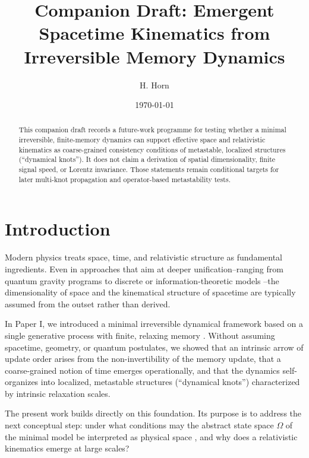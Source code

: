\documentclass[reprint,amsmath,amssymb,aps,prl,nofootinbib,floatfix]{revtex4-2}
\begin{document}
\title{Companion Draft: Emergent Spacetime Kinematics from Irreversible Memory Dynamics}

\author{H. Horn}

\date{\today}

\begin{abstract}
This companion draft records a future-work programme for testing whether a minimal irreversible, finite-memory dynamics can support effective space and relativistic kinematics as coarse-grained consistency conditions of metastable, localized structures (``dynamical knots''). It does not claim a derivation of spatial dimensionality, finite signal speed, or Lorentz invariance. Those statements remain conditional targets for later multi-knot propagation and operator-based metastability tests.
\end{abstract}

\maketitle


\section{Introduction}\label{sec:introduction}

Modern physics treats space, time, and relativistic structure as fundamental ingredients. Even in approaches that aim at deeper unification--ranging from quantum gravity programs \cite{Rovelli2004Quantum} to discrete or information-theoretic models \cite{Bombelli1987Causal,Wen2004Quantum}--the dimensionality of space and the kinematical structure of spacetime are typically assumed from the outset rather than derived.

In Paper I, we introduced a minimal irreversible dynamical framework based on a single generative process with finite, relaxing memory \cite{Mori1965Transport,Zwanzig2001Nonequilibrium,Hanggi1995Colored}. Without assuming spacetime, geometry, or quantum postulates, we showed that an intrinsic arrow of update order arises from the non-invertibility of the memory update, that a coarse-grained notion of time emerges operationally, and that the dynamics self-organizes into localized, metastable structures (``dynamical knots'') characterized by intrinsic relaxation scales.

The present work builds directly on this foundation. Its purpose is to address the next conceptual step: under what conditions may the abstract state space $\Omega$ of the minimal model be interpreted as physical space \cite{Coifman2006Diffusion,Ollivier2009Ricci}, and why does a relativistic kinematics emerge at large scales?
\end{document}
